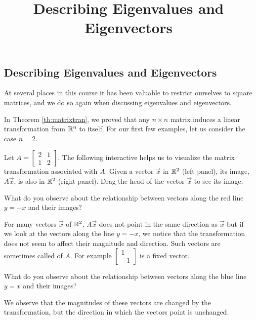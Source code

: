 \documentclass{ximera}
\title{Describing Eigenvalues and Eigenvectors} \license{CC BY-NC-SA 4.0}
\begin{document}
\begin{abstract}

\end{abstract}
\maketitle

\begin{onlineOnly}
\section*{Describing Eigenvalues and Eigenvectors}
\end{onlineOnly}

At several places in this course it has been valuable to restrict ourselves to square matrices, and we do so again when discussing eigenvalues and eigenvectors.  

In Theorem \ref{th:matrixtran}, we proved that any $n \times n$  matrix induces a linear transformation from $\mathbb{R}^n$ to itself.  For our first few examples, let us consider the case $n = 2$. 

\begin{exploration}\label{init:eignintro}
Let $A=\begin{bmatrix} 2& 1\\ 1&2
\end{bmatrix}$.  The following interactive helps us to visualize the matrix transformation associated with $A$.  Given a vector $\vec{x}$ in $\mathbb{R}^2$ (left panel), its image, $A\vec{x}$, is also in $\mathbb{R}^2$ (right panel).  Drag the head of the vector $\vec{x}$ to see its image.


\begin{onlineOnly}
\begin{center}
  \end{center}
  \end{onlineOnly}

What do you observe about the relationship between vectors along the red line $y=-x$ and their images?

  For many vectors $\vec{x}$ of $\mathbb{R}^2$, $A\vec{x}$ does not point in the same direction as $\vec{x}$ but if we look at the vectors along the line $y=-x$, we notice that the transformation does not seem to affect their magnitude and direction.  Such vectors are sometimes called  of $A$.  For example $\begin{bmatrix}1\\-1\end{bmatrix}$ is a fixed vector.

What do you observe about the relationship between vectors along the blue line $y=x$ and their images?

We observe that the magnitudes of these vectors are changed by the transformation, but the direction in which the  vectors point is unchanged.  
\end{exploration}
\end{document}
